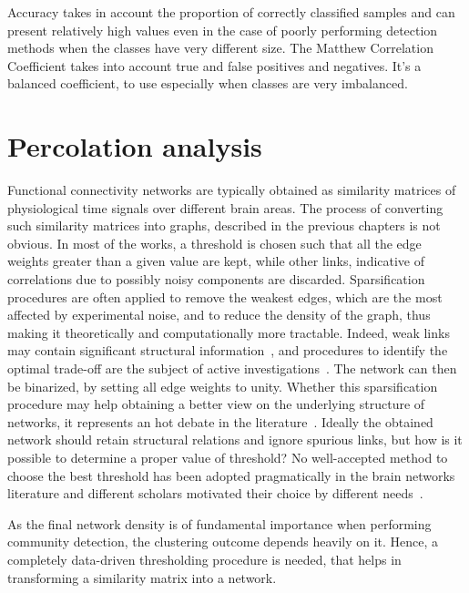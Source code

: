 Accuracy takes in account the proportion of correctly classified samples and can present relatively high values even in the case of poorly performing detection methods when the classes have very different size.
The Matthew Correlation Coefficient  takes into account true and false positives and negatives. It's a balanced coefficient, to use especially when classes are very imbalanced.


\section{Percolation analysis}\label{sec:percolation_analysis}
Functional connectivity networks are typically obtained as similarity matrices of physiological time signals over different brain areas.
The process of converting such similarity matrices into graphs, described in the previous chapters is not obvious.
In most of the works, a threshold is chosen such that all the edge weights greater than a given value are kept, while other links, indicative of correlations due to possibly noisy components are discarded.
Sparsification procedures are often applied to remove the weakest edges, which are the most affected by experimental noise, and to reduce the density of the graph, thus making it theoretically and computationally more tractable.
Indeed, weak links may contain significant structural information~\cite{thomas2011}, and procedures to identify the optimal trade-off are the subject of active investigations~\cite{zahoranszky-kohalmi2016a}.
The network can then be binarized, by setting all edge weights to unity.
Whether this sparsification procedure may help obtaining a better view on the underlying structure of networks, it represents an hot debate in the literature~\cite{rubinov2010,thomas2011}.
Ideally the obtained network should retain structural relations and ignore spurious links, but how is it possible to determine a proper value of threshold?
No well-accepted method to choose the best threshold has been adopted pragmatically in the brain networks literature and different scholars motivated their choice by different needs~\cite{gallos2012,lee2011,scheinost2012}.

As the final network density is of fundamental importance when performing community detection, the clustering outcome depends heavily on it.
Hence, a completely data-driven thresholding procedure is needed, that helps in transforming a similarity matrix into a network.


